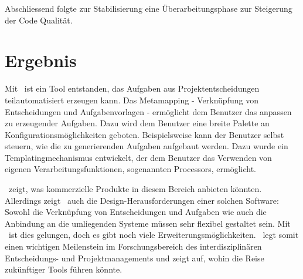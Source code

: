 	Abschliessend folgte zur Stabilisierung eine Überarbeitungsphase zur Steigerung der Code Qualität.


	\section{Ergebnis}

	Mit \eeppi\ ist ein Tool entstanden, das Aufgaben aus Projektentscheidungen teilautomatisiert erzeugen kann.
	Das Metamapping - Verknüpfung von Entscheidungen und Aufgabenvorlagen - ermöglicht dem Benutzer das anpassen zu erzeugender Aufgaben.
	Dazu wird dem Benutzer eine breite Palette an Konfigurationsmöglichkeiten geboten.
	Beispielsweise kann der Benutzer selbst steuern,
	wie die zu generierenden Aufgaben aufgebaut werden. Dazu wurde ein Templatingmechanismus entwickelt,
	der dem Benutzer das Verwenden von eigenen Verarbeitungsfunktionen, sogenannten Processors, ermöglicht.

	\eeppi\ zeigt, was kommerzielle Produkte in diesem Bereich anbieten könnten.
	Allerdings zeigt \eeppi\ auch die Design-Herausforderungen einer solchen Software:
	Sowohl die Verknüpfung von Entscheidungen und Aufgaben wie auch die Anbindung an die umliegenden Systeme müssen sehr flexibel gestaltet sein.
	Mit \eeppi\ ist dies gelungen, doch es gibt noch viele Erweiterungsmöglichkeiten.
	\eeppi\ legt somit einen wichtigen Meilenstein im Forschungsbereich des interdisziplinären Entscheidungs- und Projektmanagements und
	zeigt auf, wohin die Reise zukünftiger Tools führen könnte.
